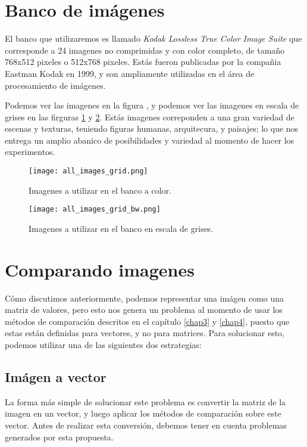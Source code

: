 \section{Banco de im\'agenes}

El banco que utilizaremos es llamado \textit{Kodak Lossless True Color Image Suite
}\cite{KodakLosslessTrueColorImageSuite} que corresponde a 24 imagenes no comprimidas y con color completo, de tama\~no 768x512 pixeles o 512x768 pixeles. Est\'as fueron publicadas por la compa\~nia Eastman Kodak en 1999, y son ampliamente utilizadas en el \'area de procesamiento de im\'agenes. 

Podemos ver las imagenes en la figura , y podemos ver las imagenes en escala de grises en las firguras \ref{fig:banco_color} y \ref{fig:banco_gris}. Est\'as imagenes correponden a una gran variedad de escenas y texturas, teniendo figuras humanas, arquitecura, y paisajes; lo que nos entrega un amplio abanico de posibilidades y variedad al momento de hacer los experimentos.

\begin{figure}[H]
    \centering
    \texttt{[image: all\_images\_grid.png]}
    \caption{Imagenes a utilizar en el banco a color.}
    \label{fig:banco_color}
\end{figure}

\begin{figure}[H]
    \centering
    \texttt{[image: all\_images\_grid\_bw.png]}
    \caption{Imagenes a utilizar en el banco en escala de grises.}
    \label{fig:banco_gris}
\end{figure}


\section{Comparando imagenes}

Cómo discutimos anteriormente, podemos representar una im\'agen como una matriz de valores, pero esto nos genera un problema al momento de usar los m\'etodos de comparaci\'on descritos en el cap\'itulo \ref{chap3} y \ref{chap4}, puesto que estas est\'an definidas para vectores, y no para matrices. Para solucionar esto, podemos utilizar una de las siguientes dos estrategias:

\subsection{Im\'agen a vector}

La forma m\'as simple de solucionar este problema es convertir la matriz de la imagen en un vector, y luego aplicar los m\'etodos de comparaci\'on sobre este vector. Antes de realizar esta conversi\'on, debemos tener en cuenta problemas generados por esta propuesta. 

